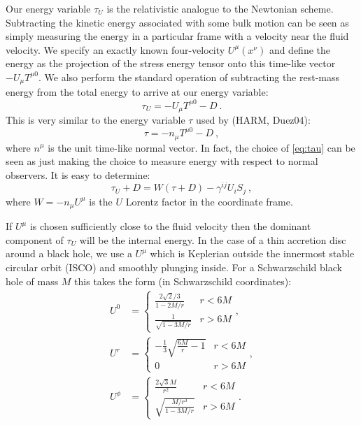 \documentclass{emulateapj}
\begin{document}
Our energy variable $\tau_U$ is the relativistic analogue to the Newtonian scheme.  Subtracting the kinetic energy associated with some bulk motion can be seen as simply measuring the energy in a particular frame with a velocity near the fluid velocity. We specify an exactly known four-velocity $U^\mu(x^\nu)$ and define the energy as the projection of the stress energy tensor onto this time-like vector $-U_\mu T^{\mu 0}$.  We also perform the standard operation of subtracting the rest-mass energy from the total energy to arrive at our energy variable:
\begin{equation}
	\tau_U = -U_\mu T^{\mu 0} - D \ . \label{eq:tauU}
\end{equation}
This is very similar to the energy variable $\tau$ used by (HARM, Duez04):
\begin{equation}
	\tau = -n_\mu T^{\mu 0} - D \ , \label{eq:tau}
\end{equation}
where $n^\mu$ is the unit time-like normal vector. In fact, the choice of \eqref{eq:tau} can be seen as just making the choice to measure energy with respect to normal observers.  It is easy to determine: %
\begin{equation}
\tau_U + D = W\left(\tau + D\right) - \gamma^{ij}U_i S_j  \ ,
\end{equation}
where $W = -n_\mu U^\mu$ is the $U$ Lorentz factor in the coordinate frame.

If $U^\mu$ is chosen sufficiently close to the fluid velocity then the dominant component of $\tau_U$ will be the internal energy.  In the case of a thin accretion disc around a black hole, we use a $U^\mu$ which is Keplerian outside the innermost stable circular orbit (ISCO) and smoothly plunging inside.  For a Schwarzschild black hole of mass $M$ this takes the form (in Schwarzschild coordinates):
\begin{align}
	U^0 &= \left \{ \begin{matrix} \frac{2\sqrt{2}/3}{1-2M/r} & r < 6M \\
						\frac{1}{\sqrt{1-3M/r}} & r > 6M \end{matrix} \right . , \nonumber \\
	U^r &= \left \{ \begin{matrix} -\frac{1}{3}\sqrt{\frac{6M}{r}-1} & r < 6M \\
						0 & r > 6M \end{matrix} \right . , \nonumber \\
	U^\phi &= \left \{ \begin{matrix}  \frac{2 \sqrt{3} M}{r^2} & r < 6M \\
						\sqrt{\frac{M/r^3}{1-3M/r}} & r > 6M \end{matrix} \right . . \label{eq:Ugeo}
\end{align}
\end{document}
